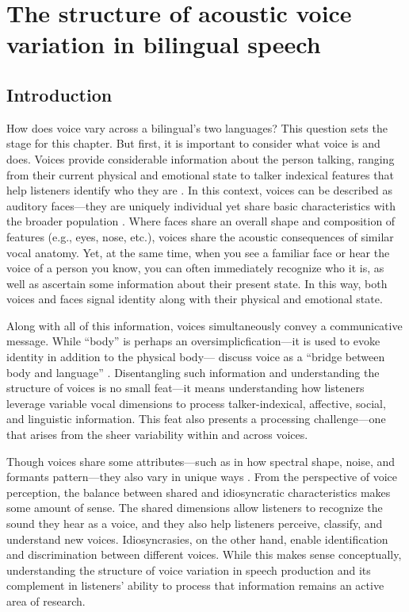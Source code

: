 \setcounter{chapter}{2}
\chapter{The structure of acoustic voice variation in bilingual speech}
\label{ch3:voice}

\section{Introduction}\label{ch3:sec:introduction}


How does voice vary across a bilingual's two languages? This question sets the stage for this chapter. But first, it is important to consider what voice is and does. Voices provide considerable information about the person talking, ranging from their current physical and emotional state to talker indexical features that help listeners identify who they are \citep{podesva_2015_voice}. In this context, voices can be described as auditory faces---they are uniquely individual yet share basic characteristics with the broader population \citep{belin_2004_voice}. Where faces share an overall shape and composition of features (e.g., eyes, nose, etc.), voices share the acoustic consequences of similar vocal anatomy. Yet, at the same time, when you see a familiar face or hear the voice of a person you know, you can often immediately recognize who it is, as well as ascertain some information about their present state. In this way, both voices and faces signal identity along with their physical and emotional state. 

Along with all of this information, voices simultaneously convey a communicative message. While ``body'' is perhaps an oversimplicfication---it is used to evoke identity in addition to the physical body---\citeauthor{podesva_2015_voice} discuss voice as a ``bridge between body and language'' \citeyearpar[][p. 175]{podesva_2015_voice}. Disentangling such information and understanding the structure of voices is no small feat---it means understanding how listeners leverage variable vocal dimensions to process talker-indexical, affective, social, and linguistic information. This feat also presents a processing challenge---one that arises from the sheer variability within and across voices. 

Though voices share some attributes---such as in how spectral shape, noise, and formants pattern---they also vary in unique ways \citep{lee_2019_acoustic}. From the perspective of voice perception, the balance between shared and idiosyncratic characteristics makes some amount of sense. The shared dimensions allow listeners to recognize the sound they hear as a voice, and they also help listeners perceive, classify, and understand new voices. Idiosyncrasies, on the other hand, enable identification and discrimination between different voices. While this makes sense conceptually, understanding the structure of voice variation in speech production and its complement in listeners' ability to process that information remains an active area of research. 

